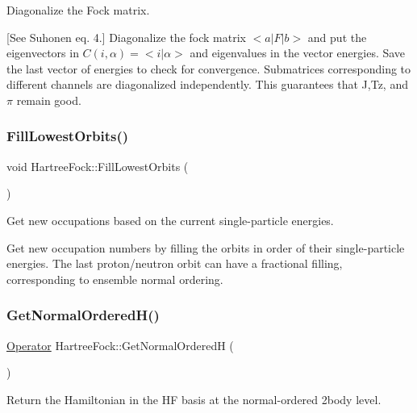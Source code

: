 Diagonalize the Fock matrix. 

\mbox{[}See Suhonen eq. 4.\mbox{]} Diagonalize the fock matrix $ <a|F|b> $ and put the eigenvectors in $C(i,\alpha) = <i|\alpha> $ and eigenvalues in the vector energies. Save the last vector of energies to check for convergence. Submatrices corresponding to different channels are diagonalized independently. This guarantees that J,Tz, and $ \pi $ remain good. \mbox{\label{classHartreeFock_a74c842cbf4e8caec72591c1205794f1f}} 
\subsubsection{\texorpdfstring{Fill\+Lowest\+Orbits()}{FillLowestOrbits()}}
{\footnotesize\ttfamily void Hartree\+Fock\+::\+Fill\+Lowest\+Orbits (\begin{DoxyParamCaption}{ }\end{DoxyParamCaption})}



Get new occupations based on the current single-\/particle energies. 

Get new occupation numbers by filling the orbits in order of their single-\/particle energies. The last proton/neutron orbit can have a fractional filling, corresponding to ensemble normal ordering. \mbox{\label{classHartreeFock_a17bdb52033e2f62bba72ea86bc196b37}} 
\subsubsection{\texorpdfstring{Get\+Normal\+Ordered\+H()}{GetNormalOrderedH()}}
{\footnotesize\ttfamily \hyperlink{classOperator}{Operator} Hartree\+Fock\+::\+Get\+Normal\+OrderedH (\begin{DoxyParamCaption}{ }\end{DoxyParamCaption})}



Return the Hamiltonian in the HF basis at the normal-\/ordered 2body level. 

